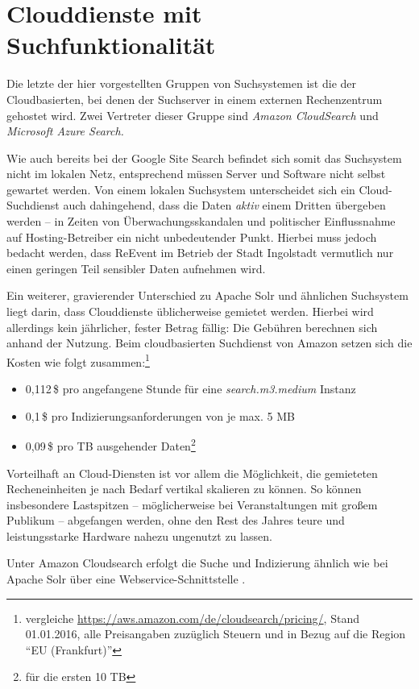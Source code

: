\section{Clouddienste mit Suchfunktionalität}
\label{sec_cloud_search}
Die letzte der hier vorgestellten Gruppen von Suchsystemen ist die der Cloudbasierten, bei denen der Suchserver in einem externen Rechenzentrum gehostet wird. Zwei Vertreter dieser Gruppe sind \emph{Amazon CloudSearch} und \emph{Microsoft Azure Search.}

Wie auch bereits bei der Google Site Search befindet sich somit das Suchsystem nicht im lokalen Netz, entsprechend müssen Server und Software nicht selbst gewartet werden. Von einem lokalen Suchsystem unterscheidet sich ein Cloud-Suchdienst auch dahingehend, dass die Daten \emph{aktiv} einem Dritten übergeben werden -- in Zeiten von Überwachungsskandalen und politischer Einflussnahme auf Hosting-Betreiber ein nicht unbedeutender Punkt. Hierbei muss jedoch bedacht werden, dass ReEvent im Betrieb der Stadt Ingolstadt vermutlich nur einen geringen Teil sensibler Daten aufnehmen wird.

Ein weiterer, gravierender Unterschied zu Apache Solr und ähnlichen Suchsystem liegt darin, dass Clouddienste üblicherweise gemietet werden. Hierbei wird allerdings kein jährlicher, fester Betrag fällig: Die Gebühren berechnen sich anhand der Nutzung. Beim cloudbasierten Suchdienst von Amazon setzen sich die Kosten wie folgt zusammen:\footnote{vergleiche \url{https://aws.amazon.com/de/cloudsearch/pricing/}, Stand 01.01.2016, alle Preisangaben zuzüglich Steuern und in Bezug auf die Region \enquote{EU (Frankfurt)}}

\begin{itemize}
	\item 0,112\,\$ pro angefangene Stunde für eine \emph{search.m3.medium} Instanz
	\item 0,1\,\$ pro  Indizierungsanforderungen von je max. 5 MB
	\item 0,09\,\$ pro TB ausgehender Daten\footnote{für die ersten 10 TB}
\end{itemize}

Vorteilhaft an Cloud-Diensten ist vor allem die Möglichkeit, die gemieteten Recheneinheiten je nach Bedarf vertikal skalieren zu können. So können insbesondere Lastspitzen -- möglicherweise bei Veranstaltungen mit großem Publikum -- abgefangen werden, ohne den Rest des Jahres teure und leistungsstarke Hardware nahezu ungenutzt zu lassen.

Unter Amazon Cloudsearch erfolgt die Suche und Indizierung ähnlich wie bei Apache Solr über eine Webservice-Schnittstelle \cite[S. 12f, 223]{AmazonWebServices.2015}.